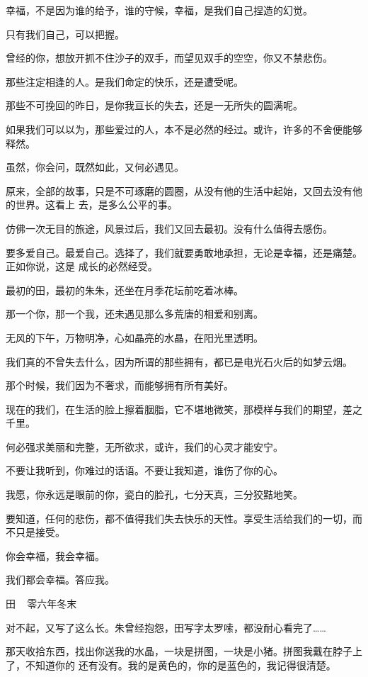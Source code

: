 		幸福，不是因为谁的给予，谁的守候，幸福，是我们自己捏造的幻觉。\par
		只有我们自己，可以把握。\par
		曾经的你，想放开抓不住沙子的双手，而望见双手的空空，你又不禁悲伤。\par
		那些注定相逢的人。是我们命定的快乐，还是遭受呢。\par
		那些不可挽回的昨日，是你我亘长的失去，还是一无所失的圆满呢。\par
		如果我们可以以为，那些爱过的人，本不是必然的经过。或许，许多的不舍便能够释然。\par
		虽然，你会问，既然如此，又何必遇见。


		原来，全部的故事，只是不可琢磨的圆圈，从没有他的生活中起始，又回去没有他的世界。这看上
	去，是多么公平的事。

		仿佛一次无目的旅途，风景过后，我们又回去最初。没有什么值得去感伤。

		要多爱自己。最爱自己。选择了，我们就要勇敢地承担，无论是幸福，还是痛楚。正如你说，这是
	成长的必然经受。


		最初的田，最初的朱朱，还坐在月季花坛前吃着冰棒。\par
		那一个你，那一个我，还未遇见那么多荒唐的相爱和别离。\par
		无风的下午，万物明净，心如晶亮的水晶，在阳光里透明。\par
		我们真的不曾失去什么，因为所谓的那些拥有，都已是电光石火后的如梦云烟。

		那个时候，我们因为不奢求，而能够拥有所有美好。\par
		现在的我们，在生活的脸上擦着胭脂，它不堪地微笑，那模样与我们的期望，差之千里。\par
		何必强求美丽和完整，无所欲求，或许，我们的心灵才能安宁。\par
		不要让我听到，你难过的话语。不要让我知道，谁伤了你的心。\par
		我愿，你永远是眼前的你，瓷白的脸孔，七分天真，三分狡黠地笑。\par
		要知道，任何的悲伤，都不值得我们失去快乐的天性。享受生活给我们的一切，而不只是接受。

		你会幸福，我会幸福。\par
		我们都会幸福。答应我。


		\vspace{1em}
		田 ~ 零六年冬末


		\vspace{2em}
		对不起，又写了这么长。朱曾经抱怨，田写字太罗嗦，都没耐心看完了……


		那天收拾东西，找出你送我的水晶，一块是拼图，一块是小猪。拼图我戴在脖子上了，不知道你的
	还有没有。我的是黄色的，你的是蓝色的，我记得很清楚。

